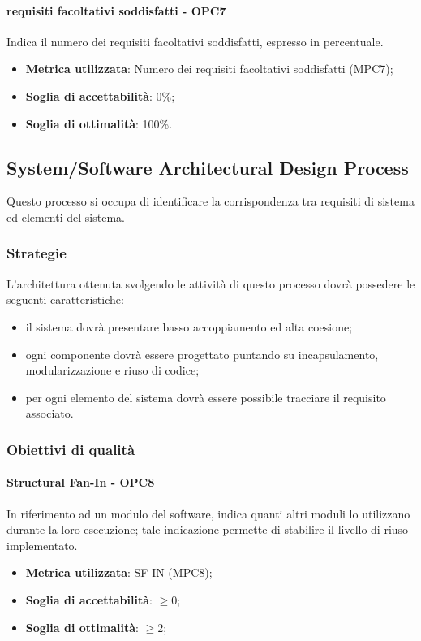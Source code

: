 \documentclass[PianoDiQualifica.tex]{subfiles}
\begin{document}
			\paragraph{requisiti facoltativi soddisfatti - OPC7}
			Indica il numero dei requisiti facoltativi soddisfatti, espresso in percentuale.
			\begin{itemize}
					\item \textbf{Metrica utilizzata}: Numero dei requisiti facoltativi soddisfatti (MPC7);
					\item \textbf{Soglia di accettabilità}: 0\%;
					\item \textbf{Soglia di ottimalità}: 100\%.
			\end{itemize}
		
	\subsection{System/Software Architectural Design Process}
		Questo processo si occupa di identificare la corrispondenza tra requisiti di sistema ed elementi del sistema.
		
		\subsubsection{Strategie}
		L'architettura ottenuta svolgendo le attività di questo processo dovrà possedere le seguenti caratteristiche:
		\begin{itemize}
		\item il sistema dovrà presentare basso accoppiamento ed alta coesione;
		\item ogni componente dovrà essere progettato puntando su incapsulamento, modularizzazione e riuso di codice;
		\item per ogni elemento del sistema dovrà essere possibile tracciare il requisito associato.
		\end{itemize}
		
		\subsubsection{Obiettivi di qualità}
			\paragraph{Structural Fan-In - OPC8}
			In riferimento ad un modulo del software, indica quanti altri moduli lo utilizzano durante la
			loro esecuzione; tale indicazione permette di stabilire il livello di riuso implementato. 
			\begin{itemize}
					\item \textbf{Metrica utilizzata}: SF-IN (MPC8);
					\item \textbf{Soglia di accettabilità}: \begin{math}\geq 0\end{math};
					\item \textbf{Soglia di ottimalità}: \begin{math}\geq 2\end{math};
			\end{itemize}
\end{document}

